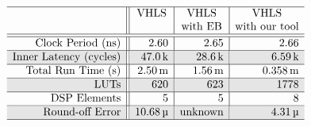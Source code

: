 \begin{table}[ht]
    \centering
    \renewcommand\arraycolsep{1.0mm}
    \newcommand\unitk{\,\text{k}}
    \newcommand\unitm{\,\text{m}}
    \newcommand\unitmu{\,\text{\textmu}}
    \newcommand\unitM{\,\text{M}}
    \newcommand\unitG{\,\text{G}}
    \newcommand\Mid[1]{\multirow{2}*{$#1$}}
    \newcommand\Shade{\cellcolor{black!10}}
    \newcommand\name[1]{\texttt{\scriptsize #1}}
    \vspace{8pt}
    $\begin{array}{r||r|r|r}
        \hline
        \multicolumn{1}{c||}{} &
        \multicolumn{1}{c|}{\text{VHLS}} &
        \multicolumn{1}{c|}{\text{VHLS}} &
        \multicolumn{1}{c}{\text{VHLS}} \\

        & &
        \multicolumn{1}{c|}{\text{with EB}} &
        \multicolumn{1}{c}{\text{with our tool}} \\ \hline\hline

        \text{Clock Period (ns)} &
        2.60 & 2.65 & 2.66 \\ \hline

        \Shade \text{Inner Latency (cycles)} &
        \Shade 47.0\unitk & \Shade 28.6\unitk & \Shade 6.59\unitk \\ \hline

        \text{Total Run Time (s)} &
        2.50\unitm & 1.56\unitm & 0.358\unitm \\ \hline

        \Shade \text{LUTs} &
        \Shade 620 & \Shade 623 & \Shade 1778 \\ \hline

        \text{DSP Elements} &
        5 & 5 & 8 \\ \hline

        \Shade \text{Round-off Error} &
        \Shade 10.68\unitmu &
        \Shade \text{unknown} &
        \Shade 4.31\unitmu \\ \hline
    \end{array}$
    \vspace{8pt}
    \caption{%
        Comparison among the optimized implementations generated by Vivado
        HLS's expression balancing and our optimizer.}
    \label{lo:tab:seidel_results}
\end{table}

